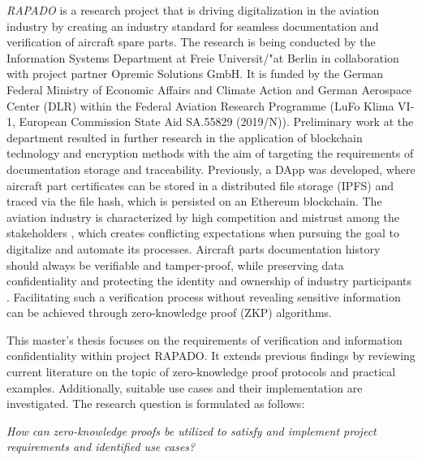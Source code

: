 \textit{RAPADO} is a research project that is driving digitalization in the aviation industry by creating an industry standard for seamless documentation and verification of aircraft spare parts. The research is being conducted by the Information Systems Department at Freie Universit{/"a}t Berlin in collaboration with project partner Opremic Solutions GmbH. It is funded by the German Federal Ministry of Economic Affairs and Climate Action and German Aerospace Center (DLR) within the Federal Aviation Research Programme (LuFo Klima VI-1, European Commission State Aid SA.55829 (2019/N)). Preliminary work at the department resulted in further research in the application of blockchain technology and encryption methods with the aim of targeting the requirements of documentation storage and traceability. Previously, a DApp was developed, where aircraft part certificates can be stored in a distributed file storage (IPFS) and traced via the file hash, which is persisted on an Ethereum blockchain.
The aviation industry is characterized by high competition and mistrust among the stakeholders \citep{Chatzi2019TDoC}, which creates conflicting expectations when pursuing the goal to digitalize and automate its processes. Aircraft parts documentation history should always be verifiable and tamper-proof, while preserving data confidentiality and protecting the identity and ownership of industry participants \citep{Wickboldt2019BlockchainFW}. Facilitating such a verification process without revealing sensitive information can be achieved through zero-knowledge proof (ZKP) algorithms.

This master's thesis focuses on the requirements of verification and information confidentiality within project RAPADO. It extends previous findings by reviewing current literature on the topic of zero-knowledge proof protocols and practical examples. Additionally, suitable use cases and their implementation are investigated. The research question is formulated as follows:

\textit{How can zero-knowledge proofs be utilized to satisfy and implement project requirements and identified use cases?} 



